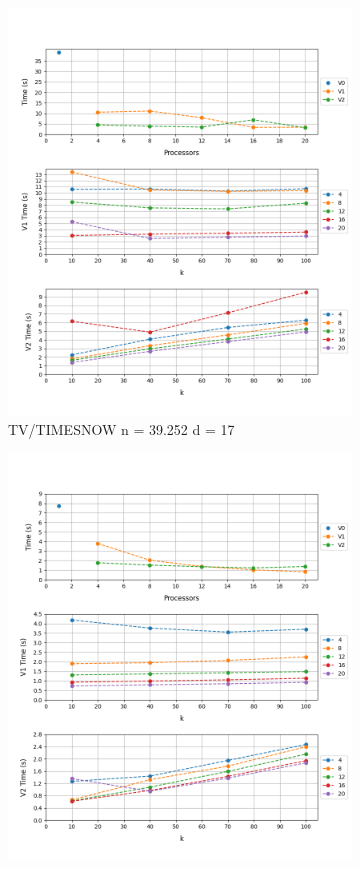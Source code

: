 \documentclass[12pt, a4paper]{article}
\begin{document}
\begin{figure}[h!]
\begin{subfigure}[b]{0.33\textwidth}
    \includegraphics[height=.20\textheight, width=\textwidth, keepaspectratio]{assets/tv/timesnow.png}
         \caption{TV/TIMESNOW n = 39.252 d = 17}
     \end{subfigure}
     \begin{subfigure}[b]{0.33\textwidth}
         \centering
         \includegraphics[height=.20\textheight, width=\textwidth, keepaspectratio]{assets/tv/bbc.png}

\end{subfigure}
\end{figure}
\end{document}
